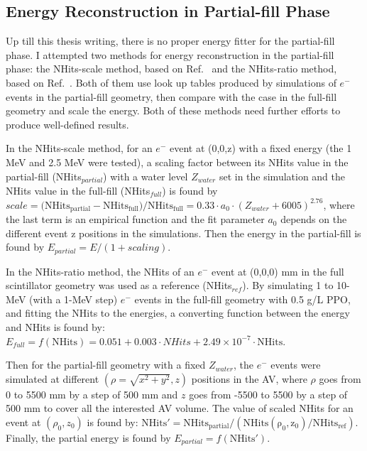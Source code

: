 \subsection{Energy Reconstruction in Partial-fill Phase}
Up till this thesis writing, there is no proper energy fitter for the partial-fill phase. I attempted two methods for energy reconstruction in the partial-fill phase: the NHits-scale method, based on Ref.~\cite{partialEnergy} and the NHits-ratio method, based on Ref.~\cite{partialEnergyYang}. Both of them use look up tables produced by simulations of $e^-$ events in the partial-fill geometry, then compare with the case in the full-fill geometry and scale the energy. Both of these methods need further efforts to produce well-defined results\cite{jiePartialEnergy,jiePartialEnergyNhitRatio}.

In the NHits-scale method, for an $e^-$ event at (0,0,z) with a fixed energy (the 1 MeV and 2.5 MeV were tested), a scaling factor between its NHits value in the partial-fill (NHits$_{partial}$) with a water level $Z_{water}$ set in the simulation and the NHits value in the full-fill (NHits$_{full}$) is found by $scale = (\mathrm{NHits_{partial} - NHits_{full})/NHits_{full}} = 0.33\cdot a_0\cdot (Z_{water}+6005)^{2.76}$, where the last term is an empirical function and the fit parameter $a_0$ depends on the different event z positions in the simulations. Then the energy in the partial-fill is found by $E_{partial} = E/(1 + scaling)$\cite{partialEnergy, jiePartialEnergy}.
 
In the NHits-ratio method, the NHits of an $e^-$ event at (0,0,0) mm in the full scintillator geometry was used as a reference (NHits$_{ref}$). By simulating 1 to 10-MeV (with a 1-MeV step) $e^-$ events in the full-fill geometry with 0.5 g/L PPO, and fitting the NHits to the energies, a converting function between the energy and NHits is found by: $E_{full} = f(\mathrm{NHits})=0.051+0.003\cdot NHits+2.49\times10^{-7}\cdot \mathrm{NHits}$\cite{jiePartialEnergyNhitRatio}.

Then for the partial-fill geometry with a fixed $Z_{water}$, the $e^-$ events were simulated at different $(\rho=\sqrt{x^2+y^2},z)$ positions in the AV, where $\rho$ goes from 0 to 5500 mm by a step of 500 mm and $z$ goes from -5500 to 5500 by a step of 500 mm to cover all the interested AV volume. The value of scaled NHits for an event at $(\rho_0,z_0)$ is found by: $\mathrm{NHits' = NHits_{partial}/(NHits(\rho_0,z_0)/NHits_{ref})}$.
Finally, the partial energy is found by $E_{partial} = f(\mathrm{NHits'})$\cite{jiePartialEnergyNhitRatio}.

